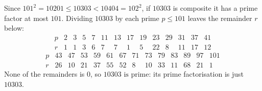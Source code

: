 Since $101^2=10201\le10303<10404=102^2$, if $10303$ is composite it has a prime factor at most $101$. Dividing $10303$ by each prime $p\le101$ leaves the remainder $r$ below:
\[\begin{array}{c|ccccccccccccc}
p&2&3&5&7&11&13&17&19&23&29&31&37&41\\\hline
r&1&1&3&6&7&7&1&5&22&8&11&17&12
\end{array}\]
\[\begin{array}{c|ccccccccccccc}
p&43&47&53&59&61&67&71&73&79&83&89&97&101\\\hline
r&26&10&21&37&55&52&8&10&33&11&68&21&1
\end{array}\]
None of the remainders is $0$, so $\boxed{10303\text{ is prime}}$: its prime factorisation is just $10303$.

